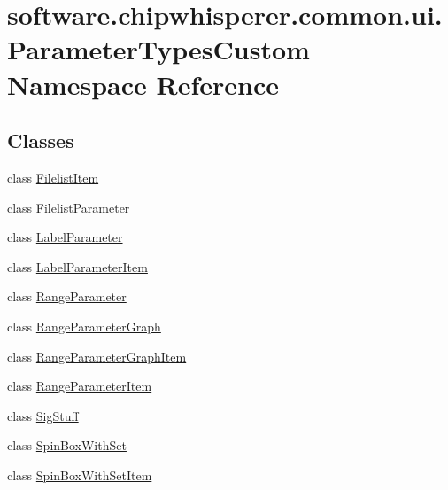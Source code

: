 \hypertarget{namespacesoftware_1_1chipwhisperer_1_1common_1_1ui_1_1ParameterTypesCustom}{}\section{software.\+chipwhisperer.\+common.\+ui.\+Parameter\+Types\+Custom Namespace Reference}
\label{namespacesoftware_1_1chipwhisperer_1_1common_1_1ui_1_1ParameterTypesCustom}
\subsection*{Classes}
\begin{DoxyCompactItemize}
\item 
class \hyperlink{classsoftware_1_1chipwhisperer_1_1common_1_1ui_1_1ParameterTypesCustom_1_1FilelistItem}{Filelist\+Item}
\item 
class \hyperlink{classsoftware_1_1chipwhisperer_1_1common_1_1ui_1_1ParameterTypesCustom_1_1FilelistParameter}{Filelist\+Parameter}
\item 
class \hyperlink{classsoftware_1_1chipwhisperer_1_1common_1_1ui_1_1ParameterTypesCustom_1_1LabelParameter}{Label\+Parameter}
\item 
class \hyperlink{classsoftware_1_1chipwhisperer_1_1common_1_1ui_1_1ParameterTypesCustom_1_1LabelParameterItem}{Label\+Parameter\+Item}
\item 
class \hyperlink{classsoftware_1_1chipwhisperer_1_1common_1_1ui_1_1ParameterTypesCustom_1_1RangeParameter}{Range\+Parameter}
\item 
class \hyperlink{classsoftware_1_1chipwhisperer_1_1common_1_1ui_1_1ParameterTypesCustom_1_1RangeParameterGraph}{Range\+Parameter\+Graph}
\item 
class \hyperlink{classsoftware_1_1chipwhisperer_1_1common_1_1ui_1_1ParameterTypesCustom_1_1RangeParameterGraphItem}{Range\+Parameter\+Graph\+Item}
\item 
class \hyperlink{classsoftware_1_1chipwhisperer_1_1common_1_1ui_1_1ParameterTypesCustom_1_1RangeParameterItem}{Range\+Parameter\+Item}
\item 
class \hyperlink{classsoftware_1_1chipwhisperer_1_1common_1_1ui_1_1ParameterTypesCustom_1_1SigStuff}{Sig\+Stuff}
\item 
class \hyperlink{classsoftware_1_1chipwhisperer_1_1common_1_1ui_1_1ParameterTypesCustom_1_1SpinBoxWithSet}{Spin\+Box\+With\+Set}
\item 
class \hyperlink{classsoftware_1_1chipwhisperer_1_1common_1_1ui_1_1ParameterTypesCustom_1_1SpinBoxWithSetItem}{Spin\+Box\+With\+Set\+Item}
\end{DoxyCompactItemize}
